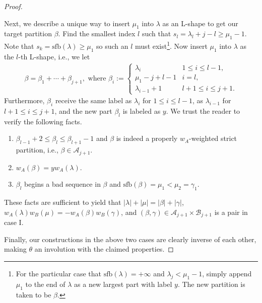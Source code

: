 \documentclass[11pt,reqno]{amsart}
\numberwithin{equation}{section}
\theoremstyle{plain}
\theoremstyle{definition}
\newcommand{\abs}[1]{\left|#1\right|}
\def\A{\mathcal{A}}
\def\la{\lambda}
\def\sfb{\mathrm{sfb}}
\def\gam{\gamma}
\newcommand{\B}{\mathcal{B}}
\begin{document}
\begin{proof}
\begin{description}
Next, we describe a unique way to insert $\mu_{1}$ into $\la$ as an L-shape to get our target partition $\beta$. Find the smallest index $l$ such that $s_l=\la_l+j-l\ge \mu_1-1$. Note that $s_k=\sfb(\la)\ge \mu_1$ so such an $l$ must exist\footnote{For the particular case that $\sfb(\la)=+\infty$ and $\la_j<\mu_1-1$, simply append $\mu_1$ to the end of $\la$ as a new largest part with label $y$. The new partition is taken to be $\beta$.}. Now insert $\mu_1$ into $\la$ as the $l$-th L-shape, i.e., we let
\begin{align*}
\beta=\beta_1+\cdots+\beta_{j+1}, \text{ where }
\beta_i:=\begin{cases}
\la_i & 1\le i\le l-1,\\
\mu_1-j+l-1 & i=l,\\
\la_{i-1}+1 & l+1\le i\le j+1.
\end{cases}
\end{align*}
Furthermore, $\beta_i$ receive the same label as $\la_i$ for $1\le i\le l-1$, as $\la_{i-1}$ for $l+1\le i\le j+1$, and the new part $\beta_l$ is labeled as $y$. We trust the reader to verify the following facts.
\begin{enumerate}
  \item $\beta_{l-1}+2\le\beta_l\le\beta_{l+1}-1$ and $\beta$ is indeed a properly $w_A$-weighted strict partition, i.e., $\beta\in\A_{j+1}$.
  \item $w_A(\beta)=yw_A(\la)$.
  \item $\beta_l$ begins a bad sequence in $\beta$ and $\sfb(\beta)=\mu_1<\mu_2=\gam_1$.
\end{enumerate}

These facts are sufficient to yield that $\abs{\la}+\abs{\mu}=\abs{\beta}+\abs{\gam}$, $w_A(\la)w_B(\mu)=-w_A(\beta)w_B(\gam)$, and $(\beta,\gam)\in\A_{j+1}\times\B_{j+1}$ is a pair in case I.



















\end{description}

Finally, our constructions in the above two cases are clearly inverse of each other, making $\theta$ an involution with the claimed properties.




\end{proof}
\end{document}
